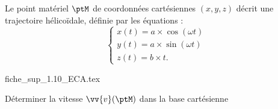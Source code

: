 \initialisationPartieGauche %
Le point matériel $\ptM$ de coordonnées cartésiennes $(x, y, z)$ décrit une trajectoire hélicoïdale, définie par les équations : 
\[
\begin{cases}
x(t)=a\times \cos(\omega t) \\
y(t)=a\times \sin(\omega t) \\
z(t)=b\times t.
\end{cases}
\] 
\initialisationPartieDroite %
\begin{center}
	{fiche_sup_1.10_ECA.tex}
\end{center}
\finalisationDuPartageDePage %




\debutEntrainement



\begin{enonce}
	Déterminer la vitesse $\vv{v}(\ptM)$ dans la base cartésienne 
\end{enonce}


